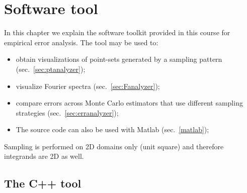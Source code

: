 %
 \chapter{Software tool}
In this chapter we explain the software toolkit provided in this course for empirical error analysis. The tool may be used to:
\begin{itemize}
 \item obtain visualizations of point-sets generated by a sampling pattern (sec.~\ref{sec:ptanalyzer});
 \item visualize Fourier spectra (sec.~\ref{sec:Fanalyzer}); 
 \item compare errors across Monte Carlo estimators that use different sampling strategies (sec.~\ref{sec:erranalyzer}); 
 \item The source code can also be used with Matlab (sec.~\ref{matlab});
\end{itemize}
Sampling is performed on 2D domains only (unit square) and therefore integrands are 2D as well. 

\section{The C++ tool}
